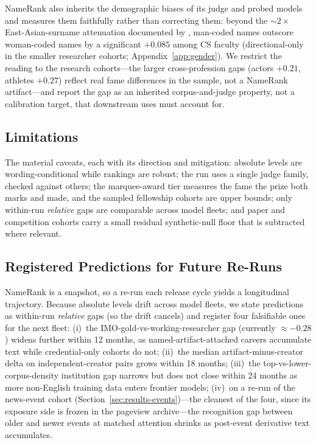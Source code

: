 \documentclass[11pt]{article}
\begin{document}
NameRank also inherits the demographic biases of its judge and probed models and measures them faithfully rather than correcting them: beyond the ${\sim}2\times$ East-Asian-surname attenuation documented by \citet{li2026ikp}, man-coded names outscore woman-coded names by a significant $+0.085$ among CS faculty (directional-only in the smaller researcher cohorts; Appendix~\ref{app:gender}). We restrict the reading to the research cohorts---the larger cross-profession gaps (actors $+0.21$, athletes $+0.27$) reflect real fame differences in the sample, not a NameRank artifact---and report the gap as an inherited corpus-and-judge property, not a calibration target, that downstream uses must account for.

\subsection{Limitations}

The material caveats, each with its direction and mitigation: absolute levels are wording-conditional while rankings are robust; the run uses a single judge family, checked against others; the marquee-award tier measures the fame the prize both marks and made, and the sampled fellowship cohorts are upper bounds; only within-run \emph{relative} gaps are comparable across model fleets; and paper and competition cohorts carry a small residual synthetic-null floor that is subtracted where relevant.

\subsection{Registered Predictions for Future Re-Runs}
\label{sec:predictions}

NameRank is a snapshot, so a re-run each release cycle yields a longitudinal trajectory. Because absolute levels drift across model fleets, we state predictions as within-run \emph{relative} gaps (so the drift cancels) and register four falsifiable ones for the next fleet: (i)~the IMO-gold-vs-working-researcher gap (currently $\approx -0.28$) widens further within 12 months, as named-artifact-attached careers accumulate text while credential-only cohorts do not; (ii)~the median artifact-minus-creator delta on independent-creator pairs grows within 18 months; (iii)~the top-vs-lower-corpus-density institution gap narrows but does not close within 24 months as more non-English training data enters frontier models; (iv)~on a re-run of the news-event cohort (Section~\ref{sec:results-events})---the cleanest of the four, since its exposure side is frozen in the pageview archive---the recognition gap between older and newer events at matched attention shrinks as post-event derivative text accumulates.
\end{document}
